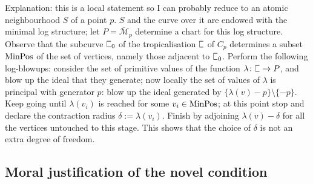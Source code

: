 \documentclass[11pt]{amsart}
\newcommand{\plC}{\scalebox{0.8}[1.3]{$\sqsubset$}}
\newcommand{\oM}{\overline{\mathcal{M}}}
\renewcommand{\to}{\rightarrow}
\theoremstyle{definition}
\theoremstyle{definition}
\begin{document}
Explanation: this is a local statement so I can probably reduce to an atomic neighbourhood $S$ of a point $p$. $S$ and the curve over it are endowed with the minimal log structure; let $P=\oM_p$ determine a chart for this log structure. Observe that the subcurve $\plC_0$ of the tropicalisation $\plC$ of $C_p$ determines a subset $\rm{MinPos}$ of the set of vertices, namely those adjacent to $\plC_0$. Perform the following log-blowups: consider the set of primitive values of the function $\lambda\colon \plC\to P$, and blow up the ideal that they generate; now locally the set of values of $\lambda$ is principal with generator $p$: blow up the ideal generated by $\{\lambda(v)-p\}\setminus\{-p\}$. Keep going until $\lambda(v_i)$ is reached for some $v_i\in\rm{MinPos}$; at this point stop and declare the contraction radius $\delta:=\lambda(v_i)$. Finish by adjoining $\lambda(v)-\delta$ for all the vertices untouched to this stage. This shows that the choice of $\delta$ is not an extra degree of freedom.

\subsection{Moral justification of the novel condition}
\end{document}
